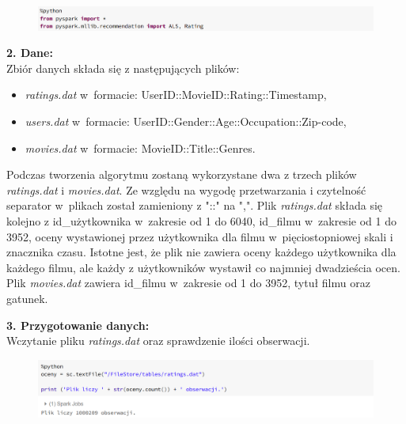 \documentclass[12pt,a4paper]{report}
\begin{document}
\begin{figure}[H]
\includegraphics[scale=0.5]{obrazy/ALS1.PNG} 
\end{figure}

\textbf{2. Dane:}
\\Zbiór danych składa się z następujących plików: 
\begin{itemize}
\item \textit{ratings.dat} w~formacie: UserID::MovieID::Rating::Timestamp,
\item \textit{users.dat} w~formacie: UserID::Gender::Age::Occupation::Zip-code,
\item \textit{movies.dat} w~formacie: MovieID::Title::Genres.
\end{itemize}
Podczas tworzenia algorytmu zostaną wykorzystane dwa z trzech plików \textit{ratings.dat} i \textit{movies.dat}. 
Ze względu na wygodę przetwarzania i czytelność separator w~plikach został zamieniony z "::" na ",".
Plik \textit{ratings.dat} składa się kolejno z id\_użytkownika w~zakresie od 1 do 6040, id\_filmu w~zakresie od 1 do 3952, oceny wystawionej przez użytkownika dla filmu w~pięciostopniowej skali i znacznika czasu. Istotne jest, że plik nie zawiera oceny każdego użytkownika dla każdego filmu, ale każdy z użytkowników wystawił co najmniej dwadzieścia ocen.
Plik \textit{movies.dat} zawiera id\_filmu w~zakresie od 1 do 3952, tytuł filmu oraz gatunek.
\bigskip

\textbf{3. Przygotowanie danych:}
\\Wczytanie pliku \textit{ratings.dat} oraz sprawdzenie ilości obserwacji.

\begin{figure}[H]
\includegraphics[scale=0.5]{obrazy/ALS2.PNG} 
\end{figure}
\end{document}
